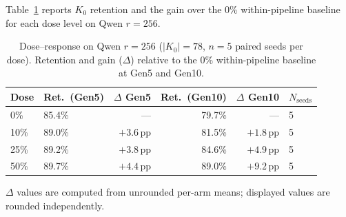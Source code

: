 \documentclass[a4paper,fleqn]{cas-dc}
\newif\ifshowchanges
\newcommand{\rev}[1]{\ifshowchanges{\color{blue}#1}\else{#1}\fi}
\begin{document}
\rev{Table~\ref{tab:interventions} reports $K_0$ retention and the gain over
the 0\% within-pipeline baseline for each dose level on Qwen $r=256$.}

\begin{table}[width=.95\linewidth,cols=6,pos=htbp]
\caption{\rev{Dose--response on Qwen $r=256$ ($\lvert K_0\rvert=78$, $n=5$ paired seeds per
dose). Retention and gain ($\Delta$) relative to the 0\% within-pipeline
baseline at Gen5 and Gen10.}}\label{tab:interventions}
\begin{tabular*}{\tblwidth}{@{} llrrrl@{} }
\toprule
\rev{Dose} & \rev{Ret.\ (Gen5)} & \rev{$\Delta$ Gen5} & \rev{Ret.\ (Gen10)} & \rev{$\Delta$ Gen10} & \rev{$N_\mathrm{seeds}$} \\
\midrule
0\%  & \rev{85.4\%} & ---             & \rev{79.7\%} & ---             & 5 \\
10\% & 89.0\% & \rev{$+3.6$}\,pp & \rev{81.5\%} & \rev{$+1.8$}\,pp & 5 \\
25\% & 89.2\% & \rev{$+3.8$}\,pp & 84.6\% & \rev{$+4.9$}\,pp & 5 \\
50\% & 89.7\% & \rev{$+4.4$}\,pp & \rev{89.0\%} & \rev{$+9.2$}\,pp & 5 \\
\bottomrule
\end{tabular*}
{\footnotesize $\Delta$ values are computed from unrounded per-arm means; displayed values are rounded independently.}
\end{table}

\end{document}
